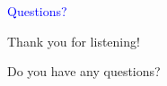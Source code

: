 \documentclass{slides}
\newcommand{\ti}[1]{\begin{center}\Large{\textcolor{blue}{#1}}\end{center}}
\begin{document}
\begin{slide}\ti{Questions?}

Thank you for listening!

Do you have any questions?

\vfill\end{slide}



\end{document}
